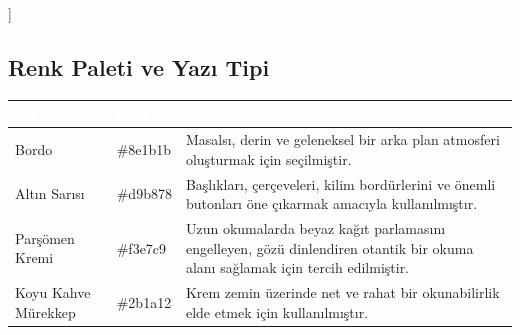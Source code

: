 \documentclass[12pt,a4paper]{article}
\begin{document}
 ]

\subsection{Renk Paleti ve Yazı Tipi}
\begin{center}
\begin{tabular}{llp{6.4cm}}
\toprule
\rowcolor{ana}\textcolor{white}{\textbf{Ad}} & \textcolor{white}{\textbf{Kod}} & \textcolor{white}{\textbf{Nerede / neden kullandınız?}} \\
\midrule
Bordo & \#8e1b1b & Masalsı, derin ve geleneksel bir arka plan atmosferi oluşturmak için seçilmiştir.\\
Altın Sarısı & \#d9b878 & Başlıkları, çerçeveleri, kilim bordürlerini ve önemli butonları öne çıkarmak amacıyla kullanılmıştır.\\
Parşömen Kremi & \#f3e7c9 & Uzun okumalarda beyaz kağıt parlamasını engelleyen, gözü dinlendiren otantik bir okuma alanı sağlamak için tercih edilmiştir.\\
Koyu Kahve Mürekkep & \#2b1a12 & Krem zemin üzerinde net ve rahat bir okunabilirlik elde etmek için kullanılmıştır.\\
\bottomrule
\end{tabular}
\end{center}
\end{document}

